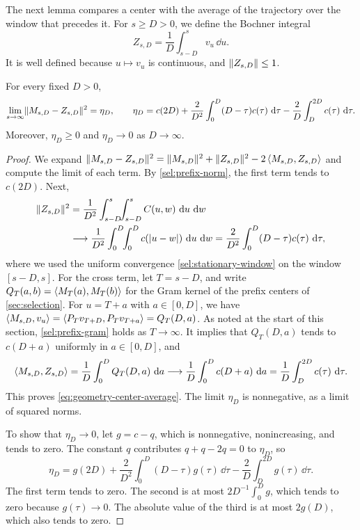 The next lemma compares a center with the average of the trajectory over the window that precedes it. For $s\ge D>0$, we define the Bochner integral
\[
 Z_{s,D}=\frac1D\int_{s-D}^sv_u\,\dd u .
\]
It is well defined because $u\mapsto v_u$ is continuous, and $\lVert Z_{s,D}\rVert\le1$.

\begin{lemma}
\label{lem:geometry-center-average}
For every fixed $D>0$,
\begin{equation}
 \lim_{s\to\infty}\lVert M_{s,D}-Z_{s,D}\rVert^2=\eta_D,
 \qquad
 \eta_D=c(2D)+\frac2{D^2}\int_0^D(D-\tau)c(\tau)\,\mathop{}\!\mathrm d\tau-\frac2D\int_D^{2D}c(\tau)\,\mathop{}\!\mathrm d\tau .
 \label{eq:geometry-center-average}
\end{equation}
Moreover, $\eta_D\ge0$ and $\eta_D\to0$ as $D\to\infty$.
\end{lemma}

\begin{proof}
We expand $\lVert M_{s,D}-Z_{s,D}\rVert^2=\lVert M_{s,D}\rVert^2+\lVert Z_{s,D}\rVert^2-2\left\langle M_{s,D},Z_{s,D}\right\rangle$ and compute the limit of each term. By \eqref{sel:prefix-norm}, the first term tends to $c(2D)$. Next,
\begin{align*}
 \norm{Z_{s,D}}^2&=\frac1{D^2}\int_{s-D}^s\!\!\int_{s-D}^sC(u,w)\,\dd u\,\dd w\\
 &\longrightarrow\frac1{D^2}\int_0^D\!\!\int_0^Dc(|u-w|)\,\dd u\,\dd w=\frac2{D^2}\int_0^D(D-\tau)c(\tau)\,\dd\tau,
\end{align*}
where we used the uniform convergence \eqref{sel:stationary-window} on the window $[s-D,s]$. For the cross term, let $T=s-D$, and write $Q_T(a,b)=\left\langle M_T(a),M_T(b)\right\rangle$ for the Gram kernel of the prefix centers of \cref{sec:selection}. For $u=T+a$ with $a\in[0,D]$, we have $\left\langle M_{s,D},v_u\right\rangle=\left\langle P_Tv_{T+D},P_Tv_{T+a}\right\rangle=Q_T(D,a)$. As noted at the start of this section, \eqref{sel:prefix-gram} holds as $T\to\infty$. It implies that $Q_T(D,a)$ tends to $c(D+a)$ uniformly in $a\in[0,D]$, and
\[
 \left\langle M_{s,D},Z_{s,D}\right\rangle=\frac1D\int_0^DQ_T(D,a)\,\mathop{}\!\mathrm d a\longrightarrow\frac1D\int_0^Dc(D+a)\,\mathop{}\!\mathrm d a=\frac1D\int_D^{2D}c(\tau)\,\mathop{}\!\mathrm d\tau .
\]
This proves \eqref{eq:geometry-center-average}. The limit $\eta_D$ is nonnegative, as a limit of squared norms.

To show that $\eta_D\to0$, let $g=c-q$, which is nonnegative, nonincreasing, and tends to zero. The constant $q$ contributes $q+q-2q=0$ to $\eta_D$, so
\[
 \eta_D=g(2D)+\frac2{D^2}\int_0^D(D-\tau)g(\tau)\,\dd\tau-\frac2D\int_D^{2D}g(\tau)\,\dd\tau .
\]
The first term tends to zero. The second is at most $2D^{-1}\int_0^Dg$, which tends to zero because $g(\tau)\to0$. The absolute value of the third is at most $2g(D)$, which also tends to zero.
\end{proof}

